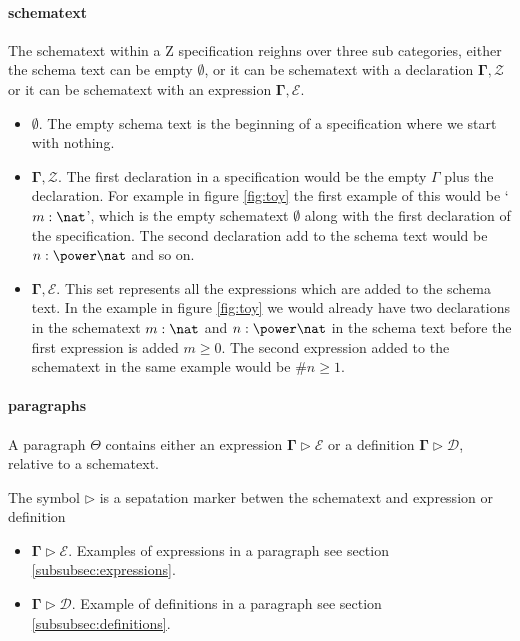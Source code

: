 \paragraph{schematext}
\label{subsubsec:schematext}

The schematext within a Z specification reighns over three sub categories,
either the schema text can be empty $\emptyset$, or it can be schematext with a
declaration $\mathbf{\Gamma}, \mathcal{Z}$ or it can be schematext with an
expression $\mathbf{\Gamma}, \mathcal{E}$.

\begin{itemize}
\item $\emptyset$. The empty schema text is the beginning of a specification
where we start with nothing.

\item $\mathbf{\Gamma}, \mathcal{Z}$. The first declaration in a specification
would be the empty $\Gamma$ plus the declaration. For example in figure
\ref{fig:toy} the first example of this would be `$m:\nat$', which is the empty
schematext $\emptyset$ along with the first declaration of the specification.
The second declaration add to the schema text would be $n:\power \nat$ and so
on.

\item $\mathbf{\Gamma}, \mathcal{E}$. This set represents all the expressions
which are added to the schema text. In the example in figure \ref{fig:toy} we
would already have two declarations in the schematext $m:\nat$ and $n:\power
\nat$ in the schema text before the first expression is added $m \geq 0$. The
second expression added to the schematext in the same example would be $\# n
\geq 1$. 

\end{itemize}

\paragraph{paragraphs}
\label{subsubsec:paragraphs}

A paragraph $\Theta$ contains either an expression $\mathbf{\Gamma}
\triangleright \mathcal{E}$ or a definition $\mathbf{\Gamma} \triangleright
\mathcal{D}$, relative to a schematext.

The symbol $\triangleright$ is a sepatation marker betwen the schematext and
expression or definition

\begin{itemize}
\item $\mathbf{\Gamma} \triangleright \mathcal{E}$. Examples of expressions in a
paragraph see section \ref{subsubsec:expressions}.

\item $\mathbf{\Gamma} \triangleright \mathcal{D}$. Example of definitions in a
paragraph see section \ref{subsubsec:definitions}.
\end{itemize}

